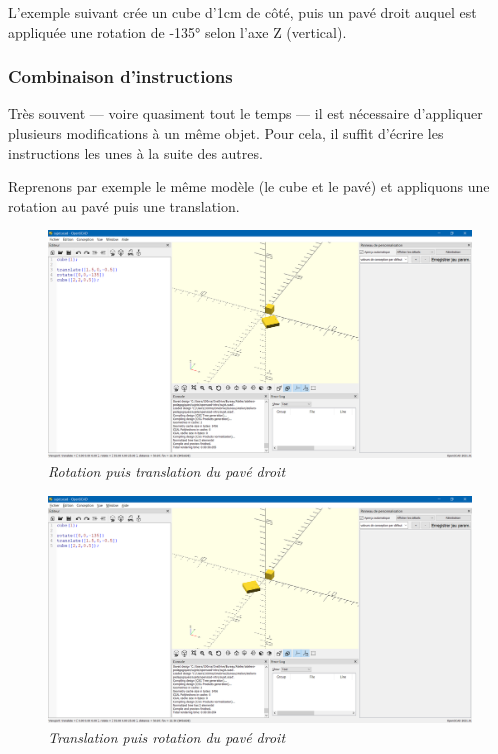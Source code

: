 L'exemple suivant crée un cube d'1cm de côté, puis un pavé droit auquel est appliquée une rotation de -135° selon l'axe Z (vertical).


\subsubsection{Combinaison d'instructions}

Très souvent — voire quasiment tout le temps — il est nécessaire d'appliquer plusieurs modifications à un même objet. 
Pour cela, il suffit d'écrire les instructions les unes à la suite des autres.

Reprenons par exemple le même modèle (le cube et le pavé) et appliquons une rotation au pavé puis une translation.

\begin{figure}[ht]
	\centering
	\includegraphics[width=12cm]{images/rotate-translate}
	\caption{\textit{Rotation puis translation du pavé droit}}
\end{figure}

\begin{figure}[ht]
	\centering
	\includegraphics[width=12cm]{images/translate-rotate}
	\caption{\textit{Translation puis rotation du pavé droit}}
\end{figure}

